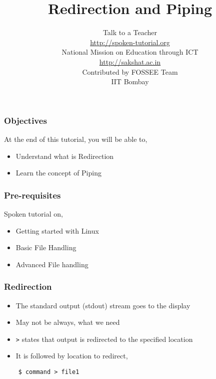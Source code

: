 \documentclass[17pt,compress]{beamer}
\author[FOSSEE]{}
\institute[IIT Bombay]{}
\date[]{}
\begin{document}
\sffamily \bfseries
\title
[Redirection and Piping]
{Redirection and Piping}
\author
[FOSSEE]
{\small Talk to a Teacher\\{\color{blue}\url{http://spoken-tutorial.org}}\\\vspace{0.25cm}National Mission on Education
 through ICT\\{\color{blue}\url{ http://sakshat.ac.in}} \\ [1.65cm]
   Contributed by FOSSEE Team \\IIT Bombay  \\[0.3cm]
}

\begin{frame}
   \titlepage
\end{frame}

\begin{frame}
\frametitle{Objectives}
\label{sec-2}

At the end of this tutorial, you will be able to,
\begin{itemize}
\item Understand what is Redirection
\item Learn the concept of Piping
\end{itemize}
\end{frame}

\begin{frame}
\frametitle{Pre-requisites}
\label{sec-3}

Spoken tutorial on,
\begin{itemize}
\item Getting started with Linux
\item Basic File Handling
\item Advanced File handling
\end{itemize}
\end{frame}

\begin{frame}[fragile]
  \frametitle{Redirection} 

  \begin{itemize}
  \item The standard output (stdout) stream goes to the display
  \item May not be always, what we need
  \item \texttt{>} states that output is redirected to the specified location 
  \item It is followed by location to redirect,
  \end{itemize}
  \begin{lstlisting}
    $ command > file1
  \end{lstlisting} %
\end{frame}
\end{document}

